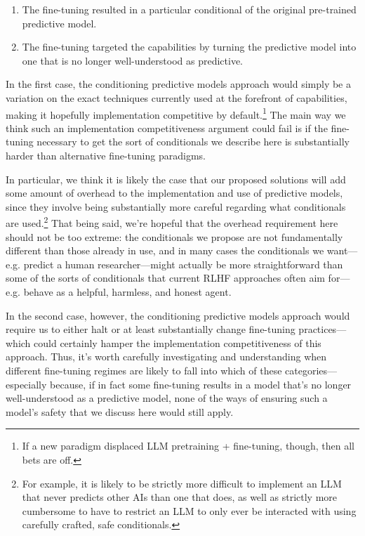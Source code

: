 {\begin{enumerate}
\item The fine-tuning resulted in a particular conditional of the original pre-trained predictive model.
\item The fine-tuning targeted the capabilities by turning the predictive model into one that is no longer well-understood as predictive.
\end{enumerate}

In the first case, the conditioning predictive models approach would simply be a variation on the exact techniques currently used at the forefront of capabilities, making it hopefully implementation competitive by default.\footnote{If a new paradigm displaced LLM pretraining + fine-tuning, though, then all bets are off.} The main way we think such an implementation competitiveness argument could fail is if the fine-tuning necessary to get the sort of conditionals we describe here is substantially harder than alternative fine-tuning paradigms.

In particular, we think it is likely the case that our proposed solutions will add some amount of overhead to the implementation and use of predictive models, since they involve being substantially more careful regarding what conditionals are used.\footnote{For example, it is likely to be strictly more difficult to implement an LLM that never predicts other AIs than one that does, as well as strictly more cumbersome to have to restrict an LLM to only ever be interacted with using carefully crafted, safe conditionals.} That being said, we're hopeful that the overhead requirement here should not be too extreme: the conditionals we propose are not fundamentally different than those already in use, and in many cases the conditionals we want---e.g. predict a human researcher---might actually be more straightforward than some of the sorts of conditionals that current RLHF approaches often aim for---e.g. behave as a helpful, harmless, and honest agent\cite{TODO: cite https://arxiv.org/abs/2204.05862}.

In the second case, however, the conditioning predictive models approach would require us to either halt or at least substantially change fine-tuning practices---which could certainly hamper the implementation competitiveness of this approach. Thus, it's worth carefully investigating and understanding when different fine-tuning regimes are likely to fall into which of these categories---especially because, if in fact some fine-tuning results in a model that's no longer well-understood as a predictive model, none of the ways of ensuring such a model's safety that we discuss here would still apply.

}

